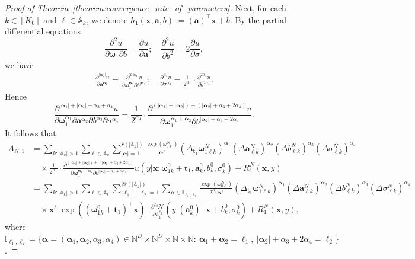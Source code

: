 \documentclass[twoside]{article}
\theoremstyle{plain}
\theoremstyle{definition}
\theoremstyle{plain}
\def\valpha{{\bm{\alpha}}}
\def\vomega{{\bm{\omega}}}
\def\vell{{\bm{\ell}}}
\def\va{{\bm{a}}}
\def\vt{{\bm{t}}}
\def\vx{{\bm{x}}}
\def\sA{{\mathbb{A}}}
\def\sI{{\mathbb{I}}}
\newcommand{\Ns}{\mathbb{N}} %
\begin{document}
\begin{proof}[Proof of Theorem~\ref{theorem:convergence_rate_of_parameters}]
Next, for each $k \in [K_0]$ and $\ell \in \sA_k$, we denote $h_1 (\vx, \va, b) := (\va)^{\top} \vx + b$. By the partial differential equations $$\frac{\partial^2 u}{\partial \vomega_{1} \partial b} = \frac{\partial u}{\partial \va}; \quad \frac{\partial^2 u}{\partial b^2} = 2\frac{\partial u}{\partial \sigma},$$ we have 
\begin{align*}
    \frac{\partial^{|\valpha_2|}u}{\partial \va^{\valpha_2}} = \frac{\partial^{2|\valpha_2|} u}{\partial \vomega_1^{\valpha_2} \partial b^{|\valpha_2|}}; \quad \frac{\partial^{\alpha_4} u}{\partial \sigma^{\alpha_4}} = \frac{1}{2^{\alpha_4}} \cdot \frac{\partial^{2\alpha_4} u}{\partial b^{2\alpha_4}}.
\end{align*}
Hence $$\frac{\partial^{|\valpha_1|+|\valpha_2| + \alpha_3 +\alpha_4}u}{\partial \vomega_1^{\valpha_1} \partial \va^{\valpha_2} \partial b^{\alpha_3} \partial \sigma^{\alpha_4}} = \frac{1}{2^{\alpha_4}} \cdot \frac{\partial^{(|\valpha_1| + |\valpha_2|) + (|\valpha_2| + \alpha_3 + 2\alpha_4)} u}{\partial \vomega_1^{\valpha_1 + \valpha_2} \partial b^{|\valpha_2| + \alpha_3 + 2\alpha_4}}.$$
It follows that 
\begin{align*}
    A_{N, 1} &= \sum_{k : |\sA_k| > 1} \sum_{\ell \in \sA_{k}} \sum_{|\valpha| = 1}^{\bar{r}(|\sA_k|)} \frac{\exp{(\omega_{0 \ell}^N)}}{\valpha!} (\Delta_{\vt_1} \vomega_{1\ell k}^N)^{\valpha_1} (\Delta \va_{\ell k}^N)^{\valpha_2} (\Delta b_{\ell k}^N)^{\alpha_3} (\Delta \sigma_{\ell k}^N)^{\alpha_4} \\
    &\quad \times \frac{1}{2^{\alpha_4}} \cdot \frac{\partial^{(|\valpha_1| + |\valpha_2|) + (|\valpha_2| + \alpha_3 + 2\alpha_4)}}{\partial \vomega_1^{\valpha_1 + \valpha_2} \partial b^{|\valpha_2| + \alpha_3 + 2\alpha_4}} u (y | \vx; \vomega_{1k}^0 + \vt_1, \va_k^0, b_k^0, \sigma_k^0) + R^N_1 (\vx, y) \\
    &= \sum_{k : |\sA_k| > 1} \sum_{\ell \in \sA_{k}} \sum_{|\vell_1| + \ell_2 = 1}^{2\bar{r}(|\sA_k|)} \sum_{\valpha \in \sI_{\vell_1, \ell_2}} \frac{\exp{(\omega_{0 \ell}^N)}}{2^{\alpha_4} \valpha!} (\Delta_{\vt_1} \vomega_{1\ell k}^N)^{\valpha_1} (\Delta \va_{\ell k}^N)^{\valpha_2} (\Delta b_{\ell k}^N)^{\alpha_3} (\Delta \sigma_{\ell k}^N)^{\alpha_4} \\
    &\quad \times \vx^{\vell_1} \exp{\left( (\vomega_{1k}^0 + \vt_1)^{\top} \vx \right)} \cdot \frac{\partial^{\ell_2} \mathcal{N}}{\partial h_1^{\ell_2}} (y | (\va_k^0)^{\top} \vx + b_k^0, \sigma_k^0) + R^N_1 (\vx, y),
\end{align*}
where $\sI_{\vell_1, \ell_{2}} = \{\valpha = (\valpha_{1}, \valpha_{2}, \alpha_{3}, \alpha_{4}) \in \Ns^{D} \times \Ns^{D} \times \Ns \times \Ns: \ \valpha_{1} + \valpha_{2} = \vell_1, \ |\valpha_{2}| + \alpha_{3} + 2 \alpha_{4} = \ell_{2}\}$.


\end{proof}
\end{document}
